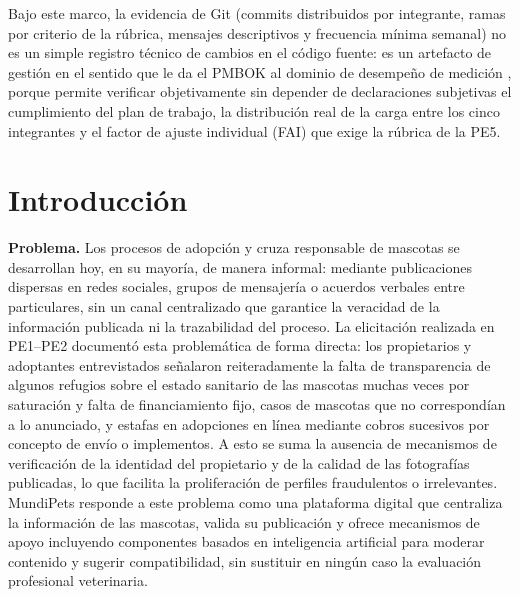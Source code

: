\documentclass[journal,onecolumn]{IEEEtran}
\begin{document}
	Bajo este marco, la evidencia de Git (commits distribuidos por integrante, ramas por
	criterio de la rúbrica, mensajes descriptivos y frecuencia mínima semanal) no es un
	simple registro técnico de cambios en el código fuente: es un artefacto de gestión en
	el sentido que le da el PMBOK al dominio de desempeño de medición \cite{pmbok7},
	porque permite verificar objetivamente sin depender de declaraciones subjetivas
	el cumplimiento del plan de trabajo, la distribución real de la carga entre los cinco
	integrantes y el factor de ajuste individual (FAI) que exige la rúbrica de la PE5.
	
	\newpage
	
	\section{Introducción}
	\textbf{Problema.} Los procesos de adopción y cruza responsable de mascotas se
	desarrollan hoy, en su mayoría, de manera informal: mediante publicaciones dispersas
	en redes sociales, grupos de mensajería o acuerdos verbales entre particulares, sin
	un canal centralizado que garantice la veracidad de la información publicada ni la
	trazabilidad del proceso. La elicitación realizada en PE1--PE2 documentó esta
	problemática de forma directa: los propietarios y adoptantes entrevistados señalaron
	reiteradamente la falta de transparencia de algunos refugios sobre el estado
	sanitario de las mascotas muchas veces por saturación y falta de financiamiento
	fijo, casos de mascotas que no correspondían a lo anunciado, y estafas en
	adopciones en línea mediante cobros sucesivos por concepto de envío o implementos. A esto se suma la ausencia de mecanismos de verificación de la
	identidad del propietario y de la calidad de las fotografías publicadas, lo que
	facilita la proliferación de perfiles fraudulentos o irrelevantes. MundiPets
	responde a este problema como una plataforma digital que centraliza la información
	de las mascotas, valida su publicación y ofrece mecanismos de apoyo incluyendo
	componentes basados en inteligencia artificial para moderar contenido y sugerir
	compatibilidad, sin sustituir en ningún caso la evaluación profesional veterinaria.
	
\end{document}
